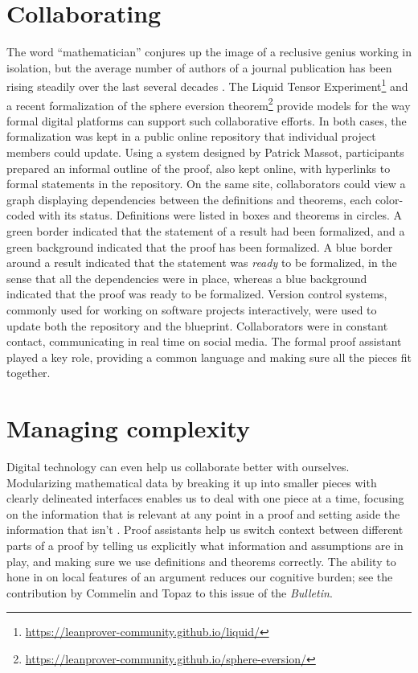 \documentclass[12pt]{amsart}
\theoremstyle{definition}
\theoremstyle{remark}
\numberwithin{equation}{section}
\begin{document}
\section{Collaborating}

The word ``mathematician'' conjures up the image of a reclusive genius working in isolation, but the average number of authors of a journal publication has been rising steadily over the last several decades \cite{grossman:05,richard:sun:21}. The Liquid Tensor Experiment\footnote{\url{https://leanprover-community.github.io/liquid/}} and a recent formalization of the sphere eversion theorem\footnote{\url{https://leanprover-community.github.io/sphere-eversion/}} \cite{van:doorn:et:al:23} provide models for the way formal digital platforms can support such collaborative efforts. In both cases, the formalization was kept in a public online repository that individual project members could update. Using a system designed by Patrick Massot, participants prepared an informal outline of the proof, also kept online, with hyperlinks to formal statements in the repository. On the same site, collaborators could view a graph displaying dependencies between the definitions and theorems, each color-coded with its status. Definitions were listed in boxes and theorems in circles. A green border indicated that the statement of a result had been formalized, and a green background indicated that the proof has been formalized. A blue border around a result indicated that the statement was \emph{ready} to be formalized, in the sense that all the dependencies were in place, whereas a blue background indicated that the proof was ready to be formalized. Version control systems, commonly used for working on software projects interactively, were used to update both the repository and the blueprint. Collaborators were in constant contact, communicating in real time on social media. The formal proof assistant played a key role, providing a common language and making sure all the pieces fit together.


\section{Managing complexity}

Digital technology can even help us collaborate better with ourselves.
Modularizing mathematical data by breaking it up into smaller pieces with clearly delineated interfaces enables us to deal with one piece at a time, focusing on the information that is relevant at any point in a proof and setting aside the information that isn't \cite{avigad:20}. Proof assistants help us switch context between different parts of a proof by telling us explicitly what information and assumptions are in play, and making sure we use definitions and theorems correctly. The ability to hone in on local features of an argument reduces our cognitive burden; see the contribution by Commelin and Topaz to this issue of the \emph{Bulletin}.
\end{document}
